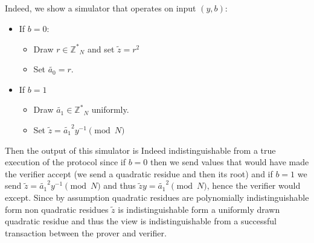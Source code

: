 \documentclass{article}
\begin{document}
\subsection{}%
Indeed, we show a simulator that operates on input $(y,b)$:
\begin{itemize}
\item If $b = 0$:
\begin{itemize}
\item Draw $r\in \mathbb{Z^*}_{N}$ and set $\tilde{z} = r^2$
\item Set $\tilde{a_0} = r$.
\end{itemize}
\item If $b=1$
\begin{itemize}
\item Draw $\tilde{a_1} \in \mathbb{Z^*}_{N}$ uniformly.
\item Set  $\tilde{z} = \tilde{a_1}^2 y^{-1} \pmod{N}$
\end{itemize}
\end{itemize}
Then the output of this simulator is Indeed indistinguishable from a true execution of the protocol since if $b=0$ then we send values that would have made the verifier accept (we send a quadratic residue and then its root) and if $b=1$ we send $\tilde{z} = \tilde{a_1}^2 y^{-1} \pmod{N}$ and thus $\tilde{z}y = \tilde{a_1}^2  \pmod{N}$, hence the verifier would except. Since by assumption quadratic residues are polynomially indistinguishable form non quadratic residues $\tilde{z}$ is indistinguishable form a uniformly drawn quadratic residue and thus the view is indistinguishable from a successful transaction between the prover and verifier.

\section{}%
\section{}%
\subsection{}%

\subsection{}%
\end{document}
